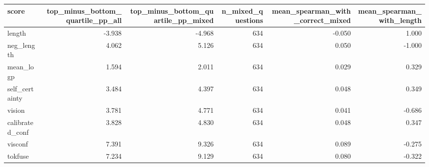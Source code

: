 \begin{tabular}{lrrrrr}
\toprule
score & top\_minus\_bottom\_quartile\_pp\_all & top\_minus\_bottom\_quartile\_pp\_mixed & n\_mixed\_questions & mean\_spearman\_with\_correct\_mixed & mean\_spearman\_with\_length \\
\midrule
length & -3.938 & -4.968 & 634 & -0.050 & 1.000 \\
neg\_length & 4.062 & 5.126 & 634 & 0.050 & -1.000 \\
mean\_logp & 1.594 & 2.011 & 634 & 0.029 & 0.329 \\
self\_certainty & 3.484 & 4.397 & 634 & 0.048 & 0.349 \\
vision & 3.781 & 4.771 & 634 & 0.041 & -0.686 \\
calibrated\_conf & 3.828 & 4.830 & 634 & 0.048 & 0.347 \\
visconf & 7.391 & 9.326 & 634 & 0.089 & -0.275 \\
tokfuse & 7.234 & 9.129 & 634 & 0.080 & -0.322 \\
\bottomrule
\end{tabular}

